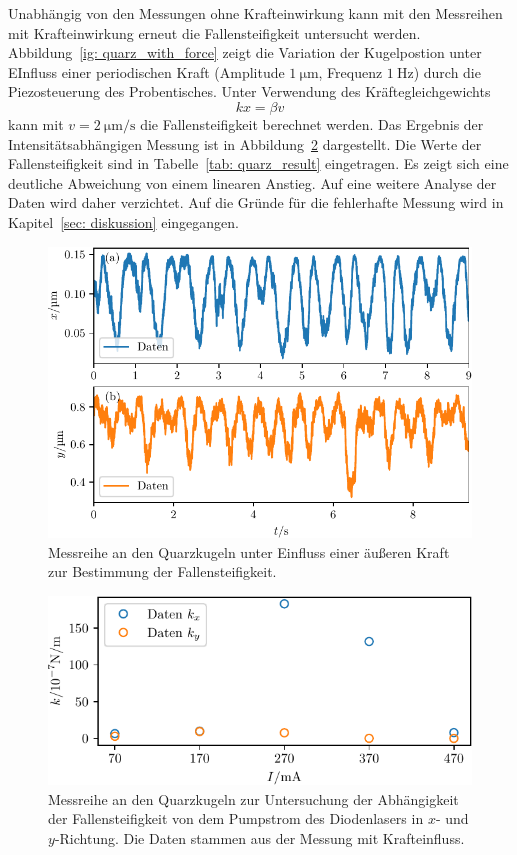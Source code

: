 \FloatBarrier
Unabhängig von den Messungen ohne Krafteinwirkung
kann mit den Messreihen mit Krafteinwirkung erneut die Fallensteifigkeit untersucht werden. Abbildung~\ref{ig: quarz_with_force} zeigt die
Variation der Kugelpostion unter EInfluss einer periodischen Kraft (Amplitude $\SI{1}{\micro\meter}$, Frequenz
$\SI{1}{\hertz}$) durch die Piezosteuerung des Probentisches. Unter Verwendung des Kräftegleichgewichts
\begin{equation}
  k x = \beta v
\end{equation}
kann mit $v = \SI{2}{\micro\meter\per\second}$ die Fallensteifigkeit berechnet werden. Das Ergebnis der
Intensitätsabhängigen Messung ist in Abbildung~\ref{fig: quarz_k_power_series_force} dargestellt. Die Werte der Fallensteifigkeit sind in
Tabelle~\ref{tab: quarz_result}
eingetragen. Es zeigt sich eine deutliche Abweichung von einem linearen Anstieg. Auf eine weitere Analyse der Daten wird daher verzichtet.
Auf die Gründe für die fehlerhafte Messung wird in Kapitel~\ref{sec: diskussion} eingegangen.
\begin{figure}
  \centering
  \includegraphics[scale = 1]{../analysis/data/i_quarz/70mA/results/with_force_70mA.pdf}
  \caption{Messreihe an den Quarzkugeln unter Einfluss einer äußeren Kraft zur Bestimmung der Fallensteifigkeit.  }
  \label{fig: quarz_with_force}
\end{figure}
\begin{figure}
  \centering
  \includegraphics[scale = 1]{../analysis/data/i_quarz/k_power_series_force.pdf}
  \caption{Messreihe an den Quarzkugeln zur Untersuchung der Abhängigkeit der Fallensteifigkeit von dem Pumpstrom des Diodenlasers
  in $x$- und $y$-Richtung. Die Daten stammen aus der Messung mit Krafteinfluss. }
  \label{fig: quarz_k_power_series_force}
\end{figure}

